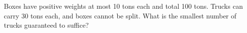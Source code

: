 Boxes have positive weights at most 10 tons each and total 100 tons. Trucks can carry 30 tons each, and boxes cannot be split. What is the smallest number of trucks guaranteed to suffice?
